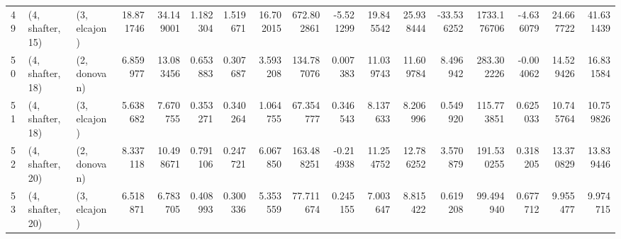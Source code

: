 \begin{tabular}{lllrrrrrrrrrrrrrr}
49 &  (4, shafter, 15) &     (3, elcajon) &  18.871746 &  34.149001 &   1.182304 &  1.519671 &  16.702015 &   672.802861 &  -5.521299 &  19.845542 &  25.938444 & -33.536252 &  1733.176706 & -4.636079 &  24.667722 &  41.631439 \\
50 &  (4, shafter, 18) &     (2, donovan) &   6.859977 &  13.083456 &   0.653883 &  0.307687 &   3.593208 &   134.787076 &   0.007383 &  11.039743 &  11.609784 &   8.496942 &   283.302226 & -0.004062 &  14.529426 &  16.831584 \\
51 &  (4, shafter, 18) &     (3, elcajon) &   5.638682 &   7.670755 &   0.353271 &  0.340264 &   1.064755 &    67.354777 &   0.346543 &   8.137633 &   8.206996 &   0.549920 &   115.773851 &  0.625033 &  10.745764 &  10.759826 \\
52 &  (4, shafter, 20) &     (2, donovan) &   8.337118 &  10.498671 &   0.791106 &  0.247721 &   6.067850 &   163.488251 &  -0.214938 &  11.254752 &  12.786252 &   3.570879 &   191.530255 &  0.318205 &  13.370829 &  13.839446 \\
53 &  (4, shafter, 20) &     (3, elcajon) &   6.518871 &   6.783705 &   0.408993 &  0.300336 &   5.353559 &    77.711674 &   0.245155 &   7.003647 &   8.815422 &   0.619208 &    99.494940 &  0.677712 &   9.955477 &   9.974715 \\
\bottomrule
\end{tabular}
